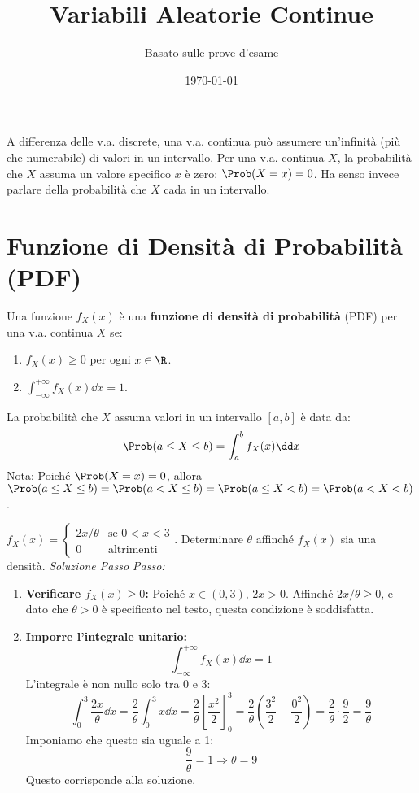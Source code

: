 

\title{Variabili Aleatorie Continue}
\author{Basato sulle prove d'esame}
\date{\today}



\maketitle
\tableofcontents
\newpage

\label{cap:va_continue}
A differenza delle v.a. discrete, una v.a. continua può assumere un'infinità (più che numerabile) di valori in un intervallo. Per una v.a. continua $X$, la probabilità che $X$ assuma un valore specifico $x$ è zero: $\Prob(X=x)=0$. Ha senso invece parlare della probabilità che $X$ cada in un intervallo.

\section{Funzione di Densità di Probabilità (PDF)}
\begin{definition}
Una funzione $f_X(x)$ è una \textbf{funzione di densità di probabilità} (PDF) per una v.a. continua $X$ se:
\begin{enumerate}
    \item $f_X(x) \ge 0$ per ogni $x \in \R$.
    \item $\int_{-\infty}^{+\infty} f_X(x) \dd x = 1$.
\end{enumerate}
La probabilità che $X$ assuma valori in un intervallo $[a,b]$ è data da:
\[ \Prob(a \le X \le b) = \int_a^b f_X(x) \dd x \]
Nota: Poiché $\Prob(X=x)=0$, allora $\Prob(a \le X \le b) = \Prob(a < X \le b) = \Prob(a \le X < b) = \Prob(a < X < b)$.
\end{definition}

\begin{example}
$f_X(x) = \begin{cases} 2x/\theta & \text{se } 0 < x < 3 \\ 0 & \text{altrimenti} \end{cases}$. Determinare $\theta$ affinché $f_X(x)$ sia una densità.
\textit{Soluzione Passo Passo:}
\begin{enumerate}
    \item \textbf{Verificare $f_X(x) \ge 0$:}
    Poiché $x \in (0,3)$, $2x > 0$. Affinché $2x/\theta \ge 0$, e dato che $\theta>0$ è specificato nel testo, questa condizione è soddisfatta.
    \item \textbf{Imporre l'integrale unitario:}
    \[ \int_{-\infty}^{+\infty} f_X(x) \dd x = 1 \]
    L'integrale è non nullo solo tra 0 e 3:
    \[ \int_0^3 \frac{2x}{\theta} \dd x = \frac{2}{\theta} \int_0^3 x \dd x = \frac{2}{\theta} \left[ \frac{x^2}{2} \right]_0^3 = \frac{2}{\theta} \left( \frac{3^2}{2} - \frac{0^2}{2} \right) = \frac{2}{\theta} \cdot \frac{9}{2} = \frac{9}{\theta} \]
    Imponiamo che questo sia uguale a 1:
    \[ \frac{9}{\theta} = 1 \Rightarrow \theta = 9 \]
    Questo corrisponde alla soluzione.
\end{enumerate}
\end{example}

